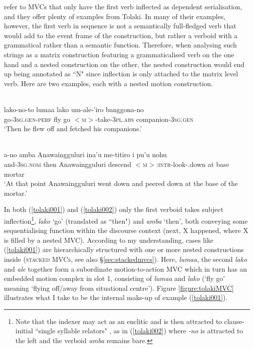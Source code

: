 \citet{mead2008verb} refer to MVCs that only have the first verb inflected as dependent serialisation, and they offer plenty of examples from Tolaki. In many of their examples, however, the first verb in sequence is not a semantically full-fledged verb that would add to the event frame of the construction, but rather a verboid with a grammatical rather than a semantic function. Therefore, when analysing such strings as a matrix construction featuring a grammaticalised verb on the one hand and a nested construction on the other, the nested construction would end up being annotated as ``N" since inflection is only attached to the matrix level verb. Here are two examples, each with a nested motion construction.

\ea \label{tolaki001}
\\
\gll lako-no-to lumaa lako um-ale-'iro banggona-no \\
go-3\textsc{sg}.\textsc{gen}-\textsc{perf} fly go $<$\textsc{m}$>$-take-3\textsc{pl}.\textsc{abs} companion-3\textsc{sg}.\textsc{gen} \\
\glft `Then he flew off and fetched his companions.' \\ 
\z

\ea \label{tolaki002}
\\
\gll a-no amba Anawaingguluri ina'u me-titiro i pu'u nohu \\
and-3\textsc{sg}.\textsc{nom} then Anawaingguluri descend $<$\textsc{m}$>$:\textsc{intr}-look-.down at base mortar \\
\glft `At that point Anawaingguluri went down and peered down at the base of the mortar.'\\ 
\z

In both (\ref{tolaki001}) and (\ref{tolaki002}) only the first verboid takes subject inflection\footnote{Note that the indexer may act as an enclitic and is then attracted to clause-initial ``single syllable relators" \citep[114]{mead2008verb}, as in (\ref{tolaki002}) where \textit{-no} is attracted to the left and the verboid \textit{amba} remains bare.}, \textit{lako} `go' (translated as ``then") and \textit{amba} `then', both conveying some sequentialising function within the discourse context (next, X happened, where X is filled by a nested MVC). According to my understanding, cases like (\ref{tolaki001}) are hierarchically structured with one or more nested constructions inside (\textsc{stacked MVCs}, see also §\ref{sec:stackedmvcs}). Here, \textit{lumaa}, the second \textit{lako} and \textit{ale} together form a subordinate motion-to-action MVC which in turn has an embedded motion complex in slot 1, consisting of \textit{lumaa} and \textit{lako} (`fly go' meaning `flying off/away from situational centre'). Figure \ref{figure:tolakiMVC} illustrates what I take to be the internal make-up of example (\ref{tolaki001}).

